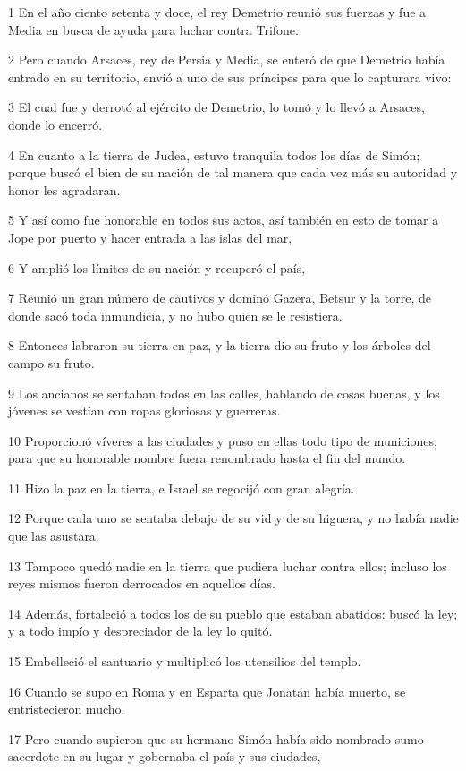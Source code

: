 \par 1 En el año ciento setenta y doce, el rey Demetrio reunió sus fuerzas y fue a Media en busca de ayuda para luchar contra Trifone.
\par 2 Pero cuando Arsaces, rey de Persia y Media, se enteró de que Demetrio había entrado en su territorio, envió a uno de sus príncipes para que lo capturara vivo:
\par 3 El cual fue y derrotó al ejército de Demetrio, lo tomó y lo llevó a Arsaces, donde lo encerró.
\par 4 En cuanto a la tierra de Judea, estuvo tranquila todos los días de Simón; porque buscó el bien de su nación de tal manera que cada vez más su autoridad y honor les agradaran.
\par 5 Y así como fue honorable en todos sus actos, así también en esto de tomar a Jope por puerto y hacer entrada a las islas del mar,
\par 6 Y amplió los límites de su nación y recuperó el país,
\par 7 Reunió un gran número de cautivos y dominó Gazera, Betsur y la torre, de donde sacó toda inmundicia, y no hubo quien se le resistiera.
\par 8 Entonces labraron su tierra en paz, y la tierra dio su fruto y los árboles del campo su fruto.
\par 9 Los ancianos se sentaban todos en las calles, hablando de cosas buenas, y los jóvenes se vestían con ropas gloriosas y guerreras.
\par 10 Proporcionó víveres a las ciudades y puso en ellas todo tipo de municiones, para que su honorable nombre fuera renombrado hasta el fin del mundo.
\par 11 Hizo la paz en la tierra, e Israel se regocijó con gran alegría.
\par 12 Porque cada uno se sentaba debajo de su vid y de su higuera, y no había nadie que las asustara.
\par 13 Tampoco quedó nadie en la tierra que pudiera luchar contra ellos; incluso los reyes mismos fueron derrocados en aquellos días.
\par 14 Además, fortaleció a todos los de su pueblo que estaban abatidos: buscó la ley; y a todo impío y despreciador de la ley lo quitó.
\par 15 Embelleció el santuario y multiplicó los utensilios del templo.
\par 16 Cuando se supo en Roma y en Esparta que Jonatán había muerto, se entristecieron mucho.
\par 17 Pero cuando supieron que su hermano Simón había sido nombrado sumo sacerdote en su lugar y gobernaba el país y sus ciudades,
